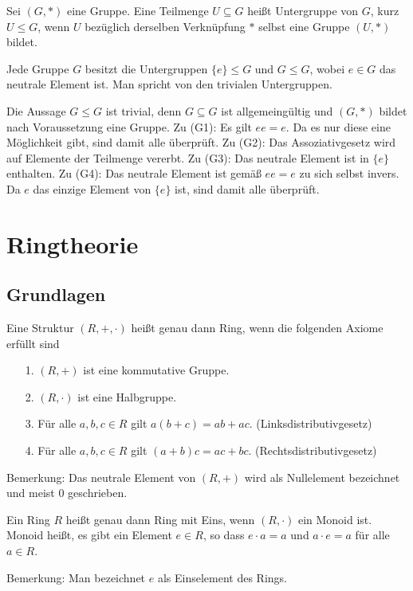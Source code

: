 \begin{Definition}[Untergruppe]
Sei $(G,*)$ eine Gruppe. Eine Teilmenge $U\subseteq G$ heißt
Untergruppe von $G$, kurz $U\le G$, wenn $U$ bezüglich derselben
Verknüpfung $*$ selbst eine Gruppe $(U,*)$ bildet.
\end{Definition}

\begin{Korollar}
Jede Gruppe $G$ besitzt die Untergruppen $\{e\}\le G$ und $G\le G$,
wobei $e\in G$ das neutrale Element ist. Man spricht von den
trivialen Untergruppen.
\end{Korollar}
\begin{Beweis}
Die Aussage $G\le G$ ist trivial, denn $G\subseteq G$ ist allgemeingültig
und $(G,*)$ bildet nach Voraussetzung eine Gruppe. Zu (G1):
Es gilt $ee=e$. Da es nur diese eine Möglichkeit gibt, sind damit alle
überprüft.
Zu (G2): Das Assoziativgesetz wird auf Elemente der Teilmenge vererbt.
Zu (G3): Das neutrale Element ist in $\{e\}$ enthalten.
Zu (G4): Das neutrale Element ist gemäß $ee=e$ zu sich selbst invers.
Da $e$ das einzige Element von $\{e\}$ ist, sind damit alle
überprüft.\;\qedsymbol
\end{Beweis}

\section{Ringtheorie}

\subsection{Grundlagen}

\begin{Definition}[Ring]
Eine Struktur $(R,+,\cdot)$ heißt genau dann Ring, wenn die folgenden
Axiome erfüllt sind
\begin{enumerate}
\item[1.] $(R,+)$ ist eine kommutative Gruppe.
\item[2.] $(R,\cdot)$ ist eine Halbgruppe.
\item[3.] Für alle $a,b,c\in R$ gilt $a(b+c) = ab+ac$. (Linksdistributivgesetz)
\item[4.] Für alle $a,b,c\in R$ gilt $(a+b)c = ac+bc$. (Rechtsdistributivgesetz)
\end{enumerate}
\end{Definition}
Bemerkung: Das neutrale Element von $(R,+)$ wird als Nullelement
bezeichnet und meist $0$ geschrieben.

\begin{Definition}
Ein Ring $R$ heißt genau dann Ring mit Eins, wenn $(R,\cdot)$ ein
Monoid ist. Monoid heißt, es gibt ein Element $e\in R$, so dass
$e\cdot a = a$ und $a\cdot e = a$ für alle $a\in R$.
\end{Definition}
Bemerkung: Man bezeichnet $e$ als Einselement des Rings.

